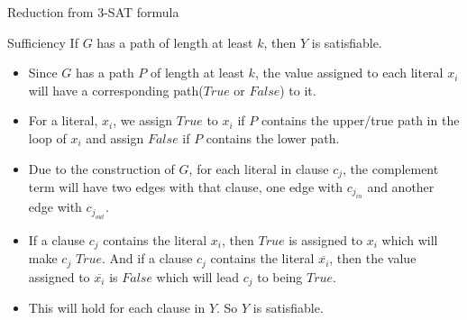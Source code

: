 \begin{frame}{Reduction from 3-SAT formula}
\begin{block}{Sufficiency}
If $G$ has a path of length at least $k$, then $Y$ is satisfiable.
\end{block}

\begin{itemize} 
    \item<1-> Since $G$ has a path $P$ of length at least $k$, the value assigned to each literal $x_i$ will have a corresponding path($True$ or $False$) to it.
        
   
         
    \item<2-> For a literal, $x_{i}$, we assign $True$ to $x_i$ if $P$ contains the upper/true path in the loop of $x_{i}$ and assign $False$ if $P$ contains the lower path. 
     \item<3-> Due to the construction of $G$, for each literal in clause $c_j$, the complement term will have two edges with that clause, one edge with $c_{j_{in}}$ and another edge with $c_{j_{out}}$.
    
    \item<4-> If a clause $c_j$ contains the literal $x_i$, then $True$ is assigned to $x_i$ which will make $c_j$ $True$. And if a clause $c_j$ contains the literal $\overline{x_i}$, then the value assigned to $\overline{x_i}$ is  $False$ which will lead $c_j$ to being $True$.
     
     
    \item<5-> This will hold for each clause in $Y$. So $Y$ is satisfiable. 
        
\end{itemize} 
\end{frame}



       
        
